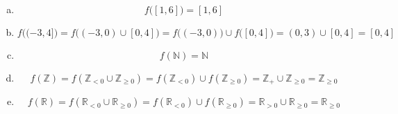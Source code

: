 \documentclass[11pt,letterpaper]{article}
\begin{document}
\begin{enumerate}[(a)]
\item 
	\[
	f \big( [1,6] \big)= [1, 6]
	\] \pspace

\item 
	\[
	f \big( (-3, 4] \big)= f \big( (-3, 0) \cup [0, 4] \big)= f \big( (-3, 0) \big) \cup f \big( [0, 4] \big)= (0, 3) \cup [0, 4]= [0, 4]
	\] \pspace
	
\item 
	\[
	f(\mathbb{N})= \mathbb{N}
	\] \pspace

\item 
	\[
	f(\mathbb{Z})= f(\mathbb{Z}_{< 0} \cup \mathbb{Z}_{\geq 0})= f(\mathbb{Z}_{< 0}) \cup f(\mathbb{Z}_{\geq 0})= \mathbb{Z}_+ \cup \mathbb{Z}_{\geq 0}= \mathbb{Z}_{\geq 0}
	\] \pspace

\item 
	\[
	f(\mathbb{R})= f(\mathbb{R}_{< 0} \cup \mathbb{R}_{\geq 0})= f(\mathbb{R}_{< 0}) \cup f(\mathbb{R}_{\geq 0})= \mathbb{R}_{> 0} \cup \mathbb{R}_{\geq 0}= \mathbb{R}_{\geq 0}
	\]
\end{enumerate}
\end{document}
